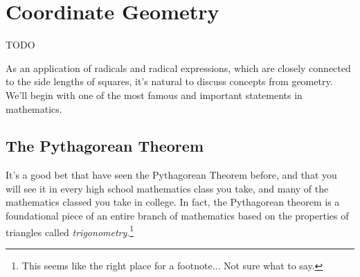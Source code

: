 %

\section{Coordinate Geometry}
\label{sec:coordgeometry}

\begin{boxedexplore}
TODO
\end{boxedexplore}


As an application of radicals and radical expressions, which are closely connected to the side lengths of squares, it's natural to discuss concepts from geometry. We'll begin with one of the most famous and important statements in mathematics.

\subsection{The Pythagorean Theorem}

It's a good bet that have seen the Pythagorean Theorem before, and that you will see it in every high school mathematics class you take, and many of the mathematics classed you take in college. In fact, the Pythagorean theorem is a foundational piece of an entire branch of mathematics based on the properties of triangles called \textit{trigonometry}.\footnote{This seems like the right place for a footnote... Not sure what to say.}

